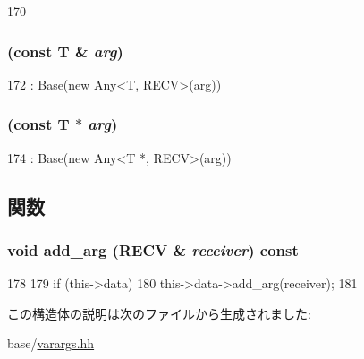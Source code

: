 \begin{DoxyCode}
170 { }
\end{DoxyCode}
\hypertarget{structVarArgs_1_1Argument_aa927dd000603438388aea5018bc34253}{
\subsubsection[{Argument}]{ (const T \& {\em arg})}}
\label{structVarArgs_1_1Argument_aa927dd000603438388aea5018bc34253}



\begin{DoxyCode}
172 : Base(new Any<T, RECV>(arg)) { }
\end{DoxyCode}
\hypertarget{structVarArgs_1_1Argument_abb9eddb942cbe7d2852e3b4f87d5a984}{
\subsubsection[{Argument}]{ (const T $\ast$ {\em arg})}}
\label{structVarArgs_1_1Argument_abb9eddb942cbe7d2852e3b4f87d5a984}



\begin{DoxyCode}
174 : Base(new Any<T *, RECV>(arg)) { }
\end{DoxyCode}


\subsection{関数}
\hypertarget{structVarArgs_1_1Argument_a98ba5fcf8063dec1f05833d6eba61854}{
\subsubsection[{add\_\-arg}]{\setlength{\rightskip}{0pt plus 5cm}void add\_\-arg (RECV \& {\em receiver}) const}}
\label{structVarArgs_1_1Argument_a98ba5fcf8063dec1f05833d6eba61854}



\begin{DoxyCode}
178     {
179         if (this->data)
180             this->data->add_arg(receiver);
181     }
\end{DoxyCode}


この構造体の説明は次のファイルから生成されました:\begin{DoxyCompactItemize}
\item 
base/\hyperlink{varargs_8hh}{varargs.hh}\end{DoxyCompactItemize}
